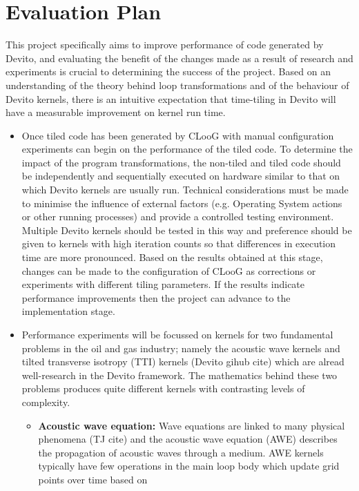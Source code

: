 \documentclass[a4paper,12pt,twoside]{report}
\begin{document}
\chapter{Evaluation Plan}
This project specifically aims to improve performance of code generated by Devito, and evaluating the benefit of the changes made
as a result of research and experiments is crucial to determining the success of the project. Based on an understanding of the theory
behind loop transformations and of the behaviour of Devito kernels, there is an intuitive expectation that time-tiling in Devito will 
have a measurable improvement on kernel run time.
\begin{itemize}
    \item Once tiled code has been generated by CLooG with manual configuration experiments can begin on the performance
        of the tiled code. To determine the impact of the program transformations, the non-tiled and tiled code should be independently
        and sequentially executed on hardware similar to that on which Devito kernels are usually run. Technical considerations must be made
        to minimise the influence of external factors (e.g. Operating System actions or other running processes) and provide a controlled testing
        environment. Multiple Devito kernels should be tested in this way and preference should be given to kernels with high iteration counts
        so that differences in execution time are more pronounced. Based on the results obtained at this stage, changes can be made to the configuration
        of CLooG as corrections or experiments with different tiling parameters. If the results indicate performance improvements then the project can advance
        to the implementation stage.
    \item Performance experiments will be focussed on kernels for two fundamental problems in the oil and gas industry; namely the acoustic wave kernels
        and tilted transverse isotropy (TTI) kernels (Devito gihub cite) which are alread well-research in the Devito framework. The mathematics 
        behind these two problems produces quite different kernels with contrasting levels of complexity.
        \begin{itemize}
            \item \textbf{Acoustic wave equation:} Wave equations are linked to many physical phenomena (TJ cite) and the acoustic wave equation (AWE) describes the propagation
                of acoustic waves through a medium. AWE kernels typically have few operations in the main loop body which update grid points over time based on

\end{itemize}
\end{itemize}
\end{document}
